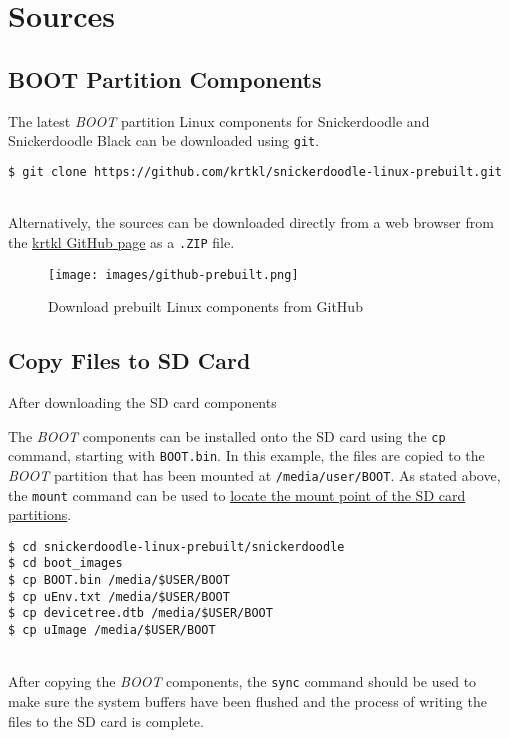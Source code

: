 \section{Sources}

\subsection{BOOT Partition Components}

The latest \textit{BOOT} partition Linux components for Snickerdoodle and Snickerdoodle Black can be downloaded using \texttt{git}. \\
\begin{lstlisting}[language=bash]
$ git clone https://github.com/krtkl/snickerdoodle-linux-prebuilt.git
\end{lstlisting}

~\\
\noindent
Alternatively, the sources can be downloaded directly from a web browser from the \href{https://github.com/krtkl/snickerdoodle-linux-prebuilt}{krtkl GitHub page} as a \texttt{.ZIP} file.

\begin{figure}[h!]
\centering
	\texttt{[image: images/github-prebuilt.png]}
	\caption{Download prebuilt Linux components from GitHub}
	\label{fig:githubprebuilt}
\end{figure}


\subsection{Copy Files to SD Card}
After downloading the SD card components

\noindent
The \textit{BOOT} components can be installed onto the SD card using the \texttt{cp} command, starting with \texttt{BOOT.bin}. In this example, the files are copied to the \textit{BOOT} partition that has been mounted at \texttt{/media/user/BOOT}. As stated above, the \texttt{mount} command can be used to \hyperref[sub:locatesd]{locate the mount point of the SD card partitions}. \\

\begin{lstlisting}
$ cd snickerdoodle-linux-prebuilt/snickerdoodle
$ cd boot_images
$ cp BOOT.bin /media/$USER/BOOT
$ cp uEnv.txt /media/$USER/BOOT
$ cp devicetree.dtb /media/$USER/BOOT
$ cp uImage /media/$USER/BOOT
\end{lstlisting}

~\\
\noindent
After copying the \textit{BOOT} components, the \texttt{sync} command should be used to make sure the system buffers have been flushed and the process of writing the files to the SD card is complete. \\

